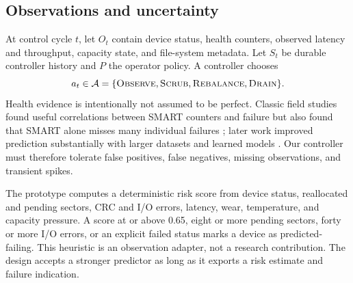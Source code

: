 \subsection{Observations and uncertainty}
At control cycle $t$, let $O_t$ contain device status, health counters, observed latency and throughput, capacity state, and file-system metadata. Let $S_t$ be durable controller history and $P$ the operator policy. A controller chooses
\begin{equation}
  a_t \in \mathcal{A} = \{\textsc{Observe},\textsc{Scrub},\textsc{Rebalance},\textsc{Drain}\}.
  \label{eq:action-space}
\end{equation}
Health evidence is intentionally not assumed to be perfect. Classic field studies found useful correlations between SMART counters and failure but also found that SMART alone misses many individual failures \citep{pinheiro2007failure}; later work improved prediction substantially with larger datasets and learned models \citep{lu2020smarter}. Our controller must therefore tolerate false positives, false negatives, missing observations, and transient spikes.

The \argosfs{} prototype computes a deterministic risk score from device status, reallocated and pending sectors, CRC and I/O errors, latency, wear, temperature, and capacity pressure. A score at or above 0.65, eight or more pending sectors, forty or more I/O errors, or an explicit failed status marks a device as predicted-failing. This heuristic is an observation adapter, not a research contribution. The design accepts a stronger predictor as long as it exports a risk estimate and failure indication.

